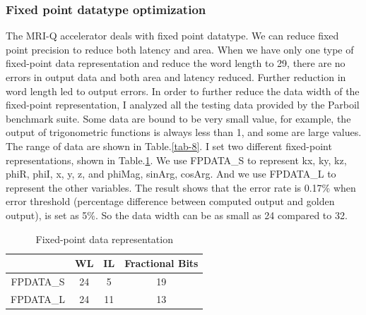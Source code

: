 \documentclass{sig-alternate}
\begin{document}
\subsubsection{Fixed point datatype optimization}
The MRI-Q accelerator deals with fixed point datatype. We can reduce fixed point precision to reduce both latency and area. When we have only one type of fixed-point data representation and reduce the word length to 29, there are no errors in output data and both area and latency reduced. Further reduction in word length led to output errors. In order to further reduce the data width of the fixed-point representation, I analyzed all the testing data provided by the Parboil benchmark suite. Some data are bound to be very small value, for example, the output of trigonometric functions is always less than 1, and some are large values. The range of data are shown in Table.\ref{tab-8}. I set two different fixed-point representations, shown in Table.\ref{tab-4}. We use FPDATA\_S to represent kx, ky, kz, phiR, phiI, x, y, z, and phiMag, sinArg, cosArg. And we use FPDATA\_L to represent the other variables. The result shows that the error rate is 0.17\% when error threshold (percentage difference between computed output and golden output), is set as 5\%. So the data width can be as small as 24 compared to 32. \\
\begin{table}[h!]
    \centering
    \begin{tabular}{c|c|c|c}
    \hline
        & WL & IL & Fractional Bits \\
        \hline
   FPDATA\_S &  24  & 5  & 19 \\ 
FPDATA\_L &  24 & 11   & 13\\
    \hline
    \end{tabular}
    \caption{Fixed-point data representation}
    \label{tab-4}
\end{table}
\end{document}
